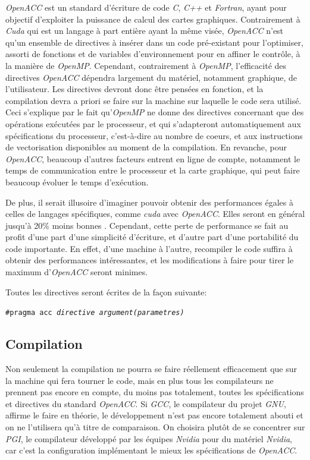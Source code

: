 \documentclass{article}
\begin{document}
\textit{OpenACC} est un standard d'écriture de code \textit{C}, \textit{C++} et \textit{Fortran}, ayant pour objectif d'exploiter la puissance de calcul des cartes graphiques. Contrairement à \textit{Cuda} qui est un langage à part entière ayant la même visée, \textit{OpenACC} n'est qu'un ensemble de directives à insérer dans un code pré-existant pour l'optimiser, assorti de fonctions et de variables d'environnement pour en affiner le contrôle, à la manière de \textit{OpenMP}. Cependant, contrairement à \textit{OpenMP}, l'efficacité des directives \textit{OpenACC} dépendra largement du matériel, notamment graphique, de l'utilisateur. Les directives devront donc être pensées en fonction, et la compilation devra a priori se faire sur la machine sur laquelle le code sera utilisé. Ceci s'explique par le fait qu'\textit{OpenMP} ne donne des directives concernant que des opérations exécutées par le processeur, et qui s'adapteront automatiquement aux spécifications du processeur, c'est-à-dire au nombre de \gls{coeur}s, et aux instructions de vectorisation disponibles au moment de la compilation. En revanche, pour \textit{OpenACC}, beaucoup d'autres facteurs entrent en ligne de compte, notamment le temps de communication entre le processeur et la carte graphique, qui peut faire beaucoup évoluer le temps d'exécution.

De plus, il serait illusoire d'imaginer pouvoir obtenir des performances égales à celles de langages spécifiques, comme \textit{\gls{cuda}} avec \textit{OpenACC}. Elles seront en général jusqu'à 20\% moins bonnes \cite{bestpract}. Cependant, cette perte de performance se fait au profit d'une part d'une simplicité d'écriture, et d'autre part d'une portabilité du code importante. En effet, d'une machine à l'autre, recompiler le code suffira à obtenir des performances intéressantes, et les modifications à faire pour tirer le maximum d'\textit{OpenACC} seront minimes.

Toutes les directives seront écrites de la façon suivante:

\texttt{\#pragma acc \textit{directive argument(parametres)}}

\subsection{Compilation}

Non seulement la compilation ne pourra se faire réellement efficacement que sur la machine qui fera tourner le code, mais en plus tous les compilateurs ne prennent pas encore en compte, du moins pas totalement, toutes les spécifications et directives du standard \textit{OpenACC}. Si \textit{GCC}, le compilateur du projet \textit{GNU}, affirme le faire en théorie, le développement n'est pas encore totalement abouti et on ne l'utilisera qu'à titre de comparaison. On choisira plutôt de se concentrer sur \textit{PGI}, le compilateur développé par les équipes \textit{Nvidia} pour du matériel \textit{Nvidia}, car c'est la configuration implémentant le mieux les spécifications de \textit{OpenACC}.
\end{document}
